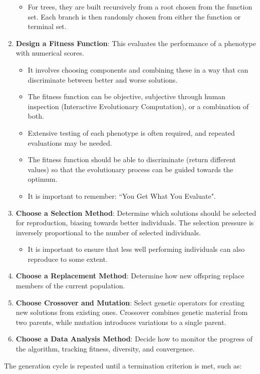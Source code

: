 \begin{enumerate}
\begin{itemize}
        \item For trees, they are built recursively from a root chosen from the function set. Each branch is then randomly chosen from either the function or terminal set.
     \end{itemize}
    \item \textbf{Design a Fitness Function}: This evaluates the performance of a phenotype with numerical scores.
    \begin{itemize}
    \item  It involves choosing components and combining these in a way that can discriminate between better and worse solutions.
    \item  The fitness function can be objective, subjective through human inspection (Interactive Evolutionary Computation), or a combination of both.
    \item Extensive testing of each phenotype is often required, and repeated evaluations may be needed.
    \item The fitness function should be able to discriminate (return different values) so that the evolutionary process can be guided towards the optimum.
    \item It is important to remember: “You Get What You Evaluate".
    \end{itemize}
    \item \textbf{Choose a Selection Method}: Determine which solutions should be selected for reproduction, biasing towards better individuals. The selection pressure is inversely proportional to the number of selected individuals.
   \begin{itemize}
     \item  It is important to ensure that less well performing individuals can also reproduce to some extent.
   \end{itemize}
    \item \textbf{Choose a Replacement Method}: Determine how new offspring replace members of the current population.
    \item \textbf{Choose Crossover and Mutation}: Select genetic operators for creating new solutions from existing ones. Crossover combines genetic material from two parents, while mutation introduces variations to a single parent.
    \item \textbf{Choose a Data Analysis Method}: Decide how to monitor the progress of the algorithm, tracking fitness, diversity, and convergence.
\end{enumerate}
The generation cycle is repeated until a termination criterion is met, such as:

